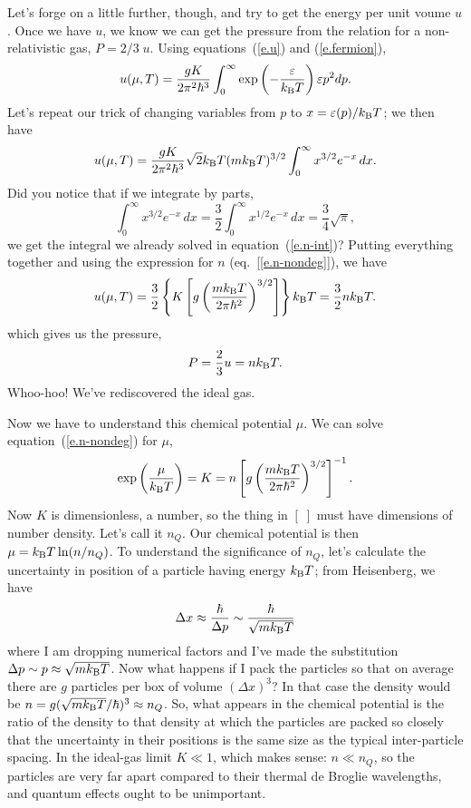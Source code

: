 Let's forge on a little further, though, and try to get the energy per unit voume $u$.  Once we have $u$, we know we can get the pressure from the relation for a non-relativistic gas, $P = 2/3\;u$.  Using equations~(\ref{e.u}) and (\ref{e.fermion}),
\begin{equation}
u(\mu,T) = \frac{gK}{2\pi^{2}\hbar^{3}}\int_{0}^{\infty}\exp\left(-\frac{\varepsilon}{k_\mathrm{B} T}\right) \varepsilon p^{2}dp.
\end{equation}
Let's repeat our trick of changing variables from $p$ to $x = \varepsilon(p)/k_\mathrm{B} T$; we then have
\begin{equation}
u(\mu,T) = \frac{gK}{2\pi^{2}\hbar^{3}}\sqrt{2}k_\mathrm{B} T(mk_\mathrm{B} T)^{3/2}\int_{0}^{\infty} x^{3/2}e^{-x}\,dx.
\end{equation}
Did you notice that if we integrate by parts,
\[
\int_{0}^{\infty} x^{3/2}e^{-x}\,dx =  \frac{3}{2}\int_{0}^{\infty}x^{1/2}e^{-x}\,dx = \frac{3}{4}\sqrt{\pi},
\]
we get the integral we already solved in equation~(\ref{e.n-int})?  Putting everything together and using the expression for $n$ (eq.~[\ref{e.n-nondeg}]), we have
\begin{equation}
u(\mu,T) = \frac{3}{2}\left\{K\left[g\left(\frac{mk_\mathrm{B} T}{2\pi\hbar^{2}}\right)^{3/2}\right] \right\}k_\mathrm{B} T = \frac{3}{2}nk_\mathrm{B} T.
\end{equation}
which gives us the pressure,
\begin{equation}\label{e.PVnkT}
P = \frac{2}{3} u = n k_\mathrm{B} T.
\end{equation}
Whoo-hoo!  We've rediscovered the ideal gas.

Now we have to understand this chemical potential $\mu$.  We can solve equation~(\ref{e.n-nondeg}) for $\mu$,
\begin{equation}\label{e.fugacity-nondeg}
\exp\left(\frac{\mu}{k_\mathrm{B} T}\right) = K = n\left[g\left(\frac{mk_\mathrm{B} T}{2\pi\hbar^{2}}\right)^{3/2}\right]^{-1}.
\end{equation}
Now $K$ is dimensionless, a number, so the thing in $[\;]$ must have dimensions of number density.  Let's call it $n_{Q}$.  Our chemical potential is then $\mu = k_\mathrm{B} T\ln(n/n_{Q})$.  To understand the significance of $n_{Q}$, let's calculate the uncertainty in position of a particle having energy $k_\mathrm{B} T$; from Heisenberg, we have
\[
\Delta x \approx \frac{\hbar}{\Delta p} \sim \frac{\hbar}{\sqrt{mk_\mathrm{B} T}}
\]
where I am dropping numerical factors and I've made the substitution $\Delta p\sim p \approx \sqrt{mk_\mathrm{B} T}$.  Now what happens if I pack the particles so that on average there are $g$ particles per box of volume $(\Delta x)^{3}$?  In that case the density would be $n = g(\sqrt{mk_\mathrm{B} T}/\hbar)^{3} \approx n_{Q}$.  So, what appears in the chemical potential is the ratio of the density to that density at which the particles are packed so closely that the uncertainty in their positions is the same size as the typical inter-particle spacing.
In the ideal-gas limit $K \ll 1$, which makes sense: $n\ll n_{Q}$, so the particles are very far apart compared to their thermal de Broglie wavelengths, and quantum effects ought to be unimportant.

